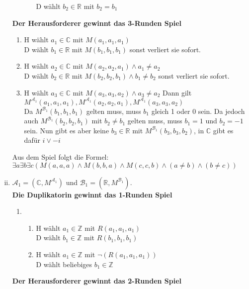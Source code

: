 \documentclass[a4paper,10pt]{article}
\newcommand{\Z}{\mathbb{Z}}
\begin{document}
\begin{enumerate}[(i)]
\begin{enumerate}
\begin{enumerate}
					D wählt $b_2 \in \mathbb{R}$ mit  $b_2 = b_1$
			\end{enumerate}
		\end{enumerate}
	\textbf{Der Herausforderer gewinnt das 3-Runden Spiel}
		\begin{enumerate}[1. \text{Zug:}]
			\item  	H wählt $a_1 \in \mathbb{C}$ mit $M(a_1,a_1,a_1)$ \\
				D wählt $b_1 \in \mathbb{R}$ mit $M(b_1,b_1,b_1)$ sonst verliert sie sofort.
			\item 	H wählt $a_2 \in \mathbb{C}$ mit $M(a_2,a_2,a_1) \land a_1 \neq a_2$ \\
				D wählt $b_2 \in \mathbb{R}$ mit $M(b_2,b_2,b_1) \land b_1 \neq b_2$ sonst verliert sie sofort.
			\item  	H wählt $a_3 \in \mathbb{C}$ mit $M(a_3,a_3,a_2) \land a_3 \neq a_2$
			Dann gilt $M^{\mathcal{A}_1}(a_1,a_1,a_1), M^{\mathcal{A}_1}(a_2,a_2,a_1), M^{\mathcal{A}_1}(a_3,a_3,a_2)$ \\
			Da $M^{\mathcal{B}_1}(b_1,b_1,b_1)$ gelten muss, muss $b_1$ gleich 1 oder 0 sein. Da jedoch auch $M^{\mathcal{B}_1}(b_2,b_2,b_1)$ mit $b_2 \neq b_1$ gelten muss, muss $b_1 = 1$ und $b_2 = -1$ sein. Nun gibt es aber keine $b_3 \in \mathbb{R}$ mit $M^{\mathcal{B}_1}(b_3,b_3,b_2)$, in $\mathbb{C}$ gibt es dafür $i \lor -i$
		\end{enumerate}
	Aus dem Spiel folgt die Formel: $\exists a \exists b \exists c (M(a,a,a) \land M(b,b,a) \land M(c,c,b) \land (a \neq b) \land (b \neq c))$ 
	\item  	$\mathcal{A}_1 = (\mathbb{C},M^{\mathcal{A}_1})$ und $\mathcal{B}_1 = (\mathbb{R}, M^{\mathcal{B}_1})$. \\
	\textbf{Die Duplikatorin gewinnt das 1-Runden Spiel}
		\begin{enumerate}[1. \text{Zug:}]
			\item  	
			\begin{enumerate}
				\item  	H wählt $a_1 \in \Z$ mit $R(a_1,a_1,a_1)$ \\
					D wählt $b_1 \in \Z$ mit $R(b_1,b_1,b_1) $ 
				\item  	H wählt $a_1 \in \mathbb{Z}$ mit $\lnot(R(a_1,a_1,a_1))$ \\
					D wählt beliebiges $b_1 \in \mathbb{Z}$
			\end{enumerate}
		\end{enumerate}
	\textbf{Der Herausforderer gewinnt das 2-Runden Spiel}
		\begin{enumerate}[1. \text{Zug:}]

\end{enumerate}
\end{enumerate}
\end{document}
